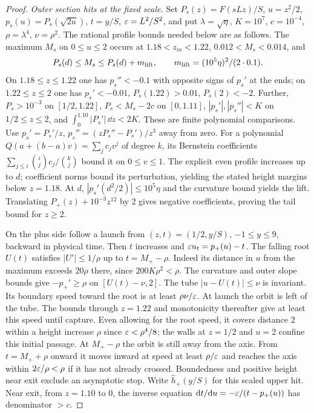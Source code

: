 \begin{proof}
\emph{Outer section hits at the fixed scale.}
Set $P_s(z)=F(sLz)/S$, $u=z^2/2$, $p_s(u)=P_s(\sqrt{2u})$,
$t=y/S$, $\varepsilon=L^2/S^2$, and put
$\lambda=\sqrt\eta$, $K=10^7$, $c=10^{-4}$, $\rho=\lambda^4$, $\nu=\rho^2$.
The rational profile bounds needed below are as follows. The maximum
$M_s$ on $0\le u\le2$ occurs at $1.18<z_m<1.22$,
$0.012<M_s<0.014$, and
\[
 P_s(d)\le M_s\le P_s(d)+m_{\rm lift},\qquad
 m_{\rm lift}=(10^5\eta)^2/(2\cdot0.1).
\]
On $1.18\le z\le1.22$ one has $p_s''<-0.1$ with opposite signs of
$p_s'$ at the ends; on $1.22\le z\le2$ one has $p_s'<-0.01$,
$P_s(1.22)>0.01$, $P_s(2)<-2$. Further,
$P_s>10^{-3}$ on $[1/2,1.22]$, $P_s<M_s-2c$ on $[0,1.11]$,
$|p_s'|,|p_s''|<K$ on $1/2\le z\le2$, and
$\int_0^{1.10}|P_s'|\,\dd z<2K$. These are finite polynomial
comparisons. Use $p_s'=P_s'/z$, $p_s''=(zP_s''-P_s')/z^3$ away
from zero. For a polynomial $Q(a+(b-a)v)=\sum_j c_j v^j$ of
degree $k$, its Bernstein coefficients
$\sum_{j\le i}\binom{i}{j}c_j/\binom{k}{j}$ bound it on $0\le v\le1$.
The explicit even profile increases up to $d$; coefficient norms
bound its perturbation, yielding the stated height margins below
$z=1.18$. At $d$, $|p_s'(d^2/2)|\le10^5\eta$ and the curvature
bound yields the lift. Translating $P_+(z)+10^{-3}z^{12}$ by $2$
gives negative coefficients, proving the tail bound for $z\ge2$.

On the plus side follow a launch from $(z,t)=(1/2,y/S)$,
$-1\le y\le9$, backward in physical time. Then $t$ increases and
$\varepsilon u_t=p_+(u)-t$. The falling root $U(t)$ satisfies $|U'|\le1/\rho$
up to $t=M_+-\rho$. Indeed its distance in $u$ from the maximum exceeds
$20\rho$ there, since $200K\rho^2<\rho$. The curvature and outer
slope bounds give $-p_+'\ge\rho$ on $[U(t)-\nu,2]$.
The tube $|u-U(t)|\le\nu$ is invariant. Its boundary speed toward the
root is at least $\rho\nu/\varepsilon$. At launch the orbit is left of
the tube. The bounds through $z=1.22$ and monotonicity thereafter
give at least this speed until capture. Even allowing for the root
speed, it covers distance $2$ within a height increase $\rho$ since
$\varepsilon<\rho^4/8$; the walls at $z=1/2$ and $u=2$ confine this
initial passage. At $M_+-\rho$ the orbit is still away from the axis.
From $t=M_++\rho$ onward it moves inward at speed at least
$\rho/\varepsilon$ and reaches the axis within $2\varepsilon/\rho<\rho$
if it has not already crossed. Boundedness and positive height near
exit exclude an asymptotic stop. Write $\widehat h_+(y/S)$ for this
scaled upper hit. Near exit, from $z=1.10$ to $0$, the inverse equation
$\mathrm{d} t/\mathrm{d} u=-\varepsilon/(t-p_+(u))$ has denominator $>c$.


\end{proof}
